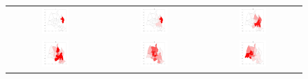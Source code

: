 \documentclass[11pt,a4paper]{article}
\begin{document}
\begin{figure}
\begin{tabular}{ccc}
  \includegraphics[width=0.3\textwidth]{bild1-1} &
  \includegraphics[width=0.3\textwidth]{bild1-10} &
\includegraphics[width=0.3\textwidth]{bild1-20} \\
  \includegraphics[width=0.3\textwidth]{bild1-30} &
  \includegraphics[width=0.3\textwidth]{bild1-40} &
  \includegraphics[width=0.3\textwidth]{bild1-50} \\

\end{tabular}
\end{figure}
\end{document}
